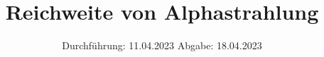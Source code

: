 

\subject{VERSUCH NUMMER 701}
\title{Reichweite von Alphastrahlung}
\date{
  Durchführung: 11.04.2023
  \hspace{3em}
  Abgabe: 18.04.2023
}



\maketitle
\thispagestyle{empty}
\tableofcontents
\newpage
\setcounter{page}{1}








\newpage
\printbibliography
\nocite{ap308}
\nocite{matplotlib}
\nocite{numpy}
\nocite{scipy}
\nocite{uncertainties}
\nocite{reback2020pandas}

\newpage
%
%
%


